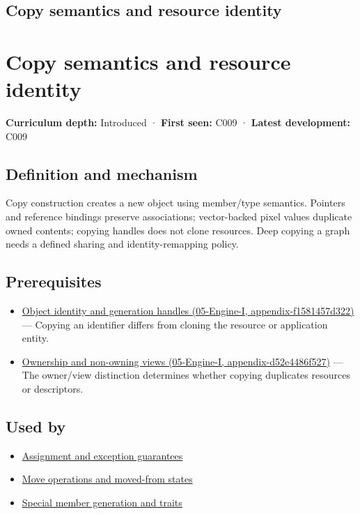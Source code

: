\hypertarget{appendix-1340cd1ce582}{}
\section*{Copy semantics and resource identity}
\chapter{Copy semantics and resource identity}\label{appendix-1340cd1ce582-copy-semantics-and-resource-identity}

\textbf{Curriculum depth:} Introduced · \textbf{First seen:} C009 · \textbf{Latest development:} C009

\section{Definition and mechanism}\label{appendix-1340cd1ce582-definition-and-mechanism}

Copy construction creates a new object using member/type semantics. Pointers and reference bindings preserve associations; vector-backed pixel values duplicate owned contents; copying handles does not clone resources. Deep copying a graph needs a defined sharing and identity-remapping policy.

\section{Prerequisites}\label{appendix-1340cd1ce582-prerequisites}

\begin{itemize}
\tightlist
\item
  \href{../05-Engine-I/main.pdf\#nameddest=appendix-f1581457d322}{Object identity and generation handles (05-Engine-I, appendix-f1581457d322)} --- Copying an identifier differs from cloning the resource or application entity.
\item
  \href{../05-Engine-I/main.pdf\#nameddest=appendix-d52e4486f527}{Ownership and non-owning views (05-Engine-I, appendix-d52e4486f527)} --- The owner/view distinction determines whether copying duplicates resources or descriptors.
\end{itemize}

\section{Used by}\label{appendix-1340cd1ce582-used-by}

\begin{itemize}
\tightlist
\item
  \hyperref[appendix-bea6beb5350f]{Assignment and exception guarantees}
\item
  \hyperref[appendix-5636651017c2]{Move operations and moved-from states}
\item
  \hyperref[appendix-42e02a12c694]{Special member generation and traits}
\end{itemize}

